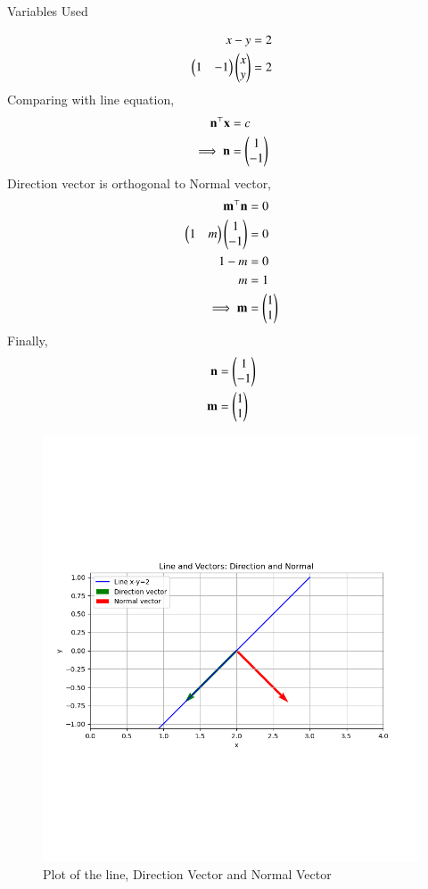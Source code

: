 \documentclass[journal]{IEEEtran}
\begin{document}
\solution
\begin{table}[h!]    
  \centering
  
  \caption{Variables Used}
  \label{tab4.2.10.1}
\end{table}
\begin{align}
    x-y&=2 \\
    \begin{pmatrix}1 & -1\end{pmatrix}\begin{pmatrix}x \\ y\end{pmatrix}&=2
\end{align}
Comparing with line equation,
\begin{align}
    \mathbf{n}^\top\mathbf{x}&=c \\
    \implies\mathbf{n}&=\begin{pmatrix}1 \\ -1\end{pmatrix}
\end{align}
Direction vector is orthogonal to Normal vector,
\begin{align}
    \mathbf{m}^\top\mathbf{n}&=0 \\
    \begin{pmatrix}1 & m\end{pmatrix}\begin{pmatrix}1 \\ -1\end{pmatrix}&=0 \\
    1-m&=0 \\
    m&=1 \\
    \implies \mathbf{m}&=\begin{pmatrix}1 \\ 1\end{pmatrix}
\end{align}
Finally,
\begin{align}
    \mathbf{n}&=\begin{pmatrix}1 \\ -1\end{pmatrix} \\
    \mathbf{m}&=\begin{pmatrix}1 \\ 1\end{pmatrix}
\end{align}
\begin{figure}[ht!]
	\centering
   	\includegraphics[width=0.8\linewidth]{figs/fig.png}
   	\caption{Plot of the line, Direction Vector and Normal Vector}
\label{Plot}
\end{figure}
\end{document}
